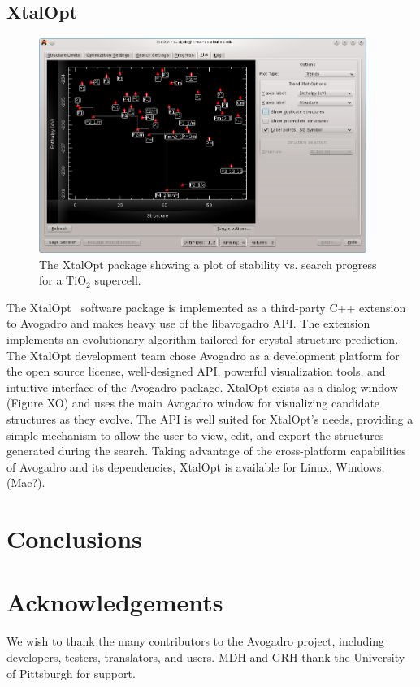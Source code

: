 \documentclass{article}
\begin{document}
\subsection{XtalOpt}

\begin{figure}
  \includegraphics[width=0.95\textwidth]{images/xtalopt}
  \caption{The XtalOpt package showing a plot of stability vs. search progress
    for a $\mathrm{TiO_2}$ supercell.}
  \label{f:xtalopt}
\end{figure}

The XtalOpt~\cite{xo1, xo2} software package is implemented as a third-party C++
extension to Avogadro and makes heavy use of the libavogadro API. The extension
implements an evolutionary algorithm tailored for crystal structure prediction.
The XtalOpt development team chose Avogadro as a development platform for the
open source license, well-designed API, powerful visualization tools, and
intuitive interface of the Avogadro package. XtalOpt exists as a dialog window
(Figure XO) and uses the main Avogadro window for visualizing candidate
structures as they evolve. The API is well suited for XtalOpt’s needs,
providing a simple mechanism to allow the user to view, edit, and export the
structures generated during the search. Taking advantage of the cross-platform
capabilities of Avogadro and its dependencies, XtalOpt is available for Linux,
Windows, (Mac?).

\section{Conclusions}

\section{Acknowledgements}

We wish to thank the many contributors to the Avogadro project, including
developers, testers, translators, and users. MDH and GRH thank the University
of Pittsburgh for support.



\end{document}
